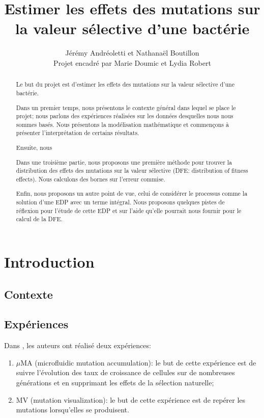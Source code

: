 \documentclass[12pt]{article}
\title{Estimer les effets des mutations sur la valeur sélective d'une bactérie}
\author{Jérémy Andréoletti et Nathanaël Boutillon\\Projet encadré par Marie Doumic et Lydia Robert}
\newcounter{prop}[section]
\begin{document}
\maketitle

\begin{abstract}
  Le but du projet est d'estimer les effets des mutations sur la valeur sélective d'une bactérie.

  Dans un premier temps, nous présentons le contexte général dans lequel se place le projet; nous parlons des expériences réalisées sur les données desquelles nous nous sommes basés. Nous présentons la modélisation mathématique et commençons à présenter l'interprétation de certains résultats.

  Ensuite, nous 

  Dans une troisième partie, nous proposons une première méthode pour trouver la distribution des effets des mutations sur la valeur sélective (DFE: distribution of fitness effects). Nous calculons des bornes sur l'erreur commise.

  Enfin, nous proposons un autre point de vue, celui de considérer le processus comme la solution d'une EDP avec un terme intégral. Nous proposons quelques pistes de réflexion pour l'étude de cette EDP et sur l'aide qu'elle pourrait nous fournir pour le calcul de la DFE.

\end{abstract}

\tableofcontents

\newpage

\section{Introduction}

\subsection{Contexte}

\subsection{Expériences}

Dans \cite{rob}, les auteurs ont réalisé deux expériences: 
\begin{enumerate}
\item $\mu$MA (microfluidic mutation accumulation): le but de cette expérience est de suivre l'évolution des taux de croissance de cellules sur de nombreuses générations et en supprimant les effets de la sélection naturelle;
\item MV (mutation visualization): le but de cette expérience est de repérer les mutations lorsqu'elles se produisent.
\end{enumerate}
\end{document}
